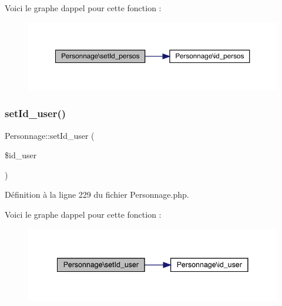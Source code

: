 Voici le graphe d\textquotesingle{}appel pour cette fonction \+:\nopagebreak
\begin{figure}[H]
\begin{center}
\leavevmode
\includegraphics[width=350pt]{class_personnage_ac11963514b5d9911283b7ff61e094125_cgraph}
\end{center}
\end{figure}
\mbox{\label{class_personnage_abe08b8cf03683f5a0f577ff7f1ac88f2}} 
\subsubsection{\texorpdfstring{set\+Id\+\_\+user()}{setId\_user()}}
{\footnotesize\ttfamily Personnage\+::set\+Id\+\_\+user (\begin{DoxyParamCaption}\item[{}]{\$id\+\_\+user }\end{DoxyParamCaption})}



Définition à la ligne 229 du fichier Personnage.\+php.

Voici le graphe d\textquotesingle{}appel pour cette fonction \+:\nopagebreak
\begin{figure}[H]
\begin{center}
\leavevmode
\includegraphics[width=341pt]{class_personnage_abe08b8cf03683f5a0f577ff7f1ac88f2_cgraph}
\end{center}
\end{figure}
\mbox{\label{class_personnage_a309bc50e0ac35a942d8ffceb5a4556a9}} 
